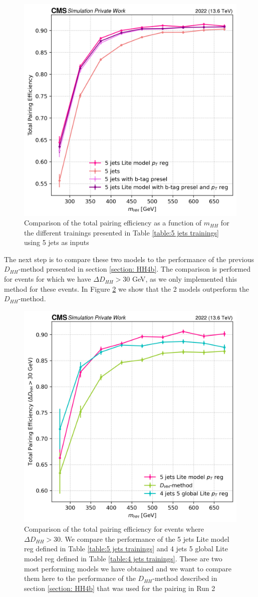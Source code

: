 \begin{figure}[h!]
    \centering
    \includegraphics[width=0.6\linewidth]{Images/6.Improving/Imput Comparisons/5j training comp.png}
    \caption{Comparison of the total pairing efficiency as a function of $m_{HH}$ for the different trainings presented in Table \ref{table:5 jets trainings} using 5 jets as inputs}
    \label{fig: comp 5j}
\end{figure}



The next step is to compare these two models to the performance of the previous $D_{HH}$-method presented in section \ref{section: HH4b}. The comparison is performed for events for which we have $\Delta D_{HH} > 30$ GeV, as we only implemented this method for these events. In Figure \ref{fig: 2 best models comp} we show that the 2 models outperform the $D_{HH}$-method. 

\begin{figure}[h!]
    \centering
    \includegraphics[width=0.6\linewidth]{Images/6.Improving/Imput Comparisons/2 best models comp run2 .png}
    \caption{Comparison of the total pairing efficiency for events where $\Delta D_{HH} > 30$. We compare the performance of the 5 jets Lite model \pt reg defined in Table \ref{table:5 jets trainings} and 4 jets 5 global Lite model \pt reg defined in  Table \ref{table:4 jets trainings}. These are two most performing models we have obtained and we want to compare them here to the performance of the $D_{HH}$-method described in section \ref{section: HH4b} that was used for the pairing in Run 2 }
    \label{fig: 2 best models comp}
\end{figure}


